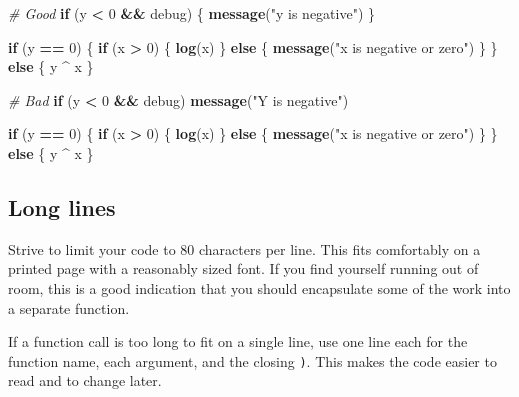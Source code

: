 \documentclass[]{book}
\newenvironment{Shaded}{\begin{snugshade}}{\end{snugshade}}
\newcommand{\KeywordTok}[1]{\textcolor[rgb]{0.13,0.29,0.53}{\textbf{#1}}}
\newcommand{\DecValTok}[1]{\textcolor[rgb]{0.00,0.00,0.81}{#1}}
\newcommand{\StringTok}[1]{\textcolor[rgb]{0.31,0.60,0.02}{#1}}
\newcommand{\CommentTok}[1]{\textcolor[rgb]{0.56,0.35,0.01}{\textit{#1}}}
\newcommand{\ControlFlowTok}[1]{\textcolor[rgb]{0.13,0.29,0.53}{\textbf{#1}}}
\newcommand{\OperatorTok}[1]{\textcolor[rgb]{0.81,0.36,0.00}{\textbf{#1}}}
\newcommand{\NormalTok}[1]{#1}
\theoremstyle{definition}
\theoremstyle{definition}
\theoremstyle{definition}
\theoremstyle{remark}
\begin{document}
\begin{Shaded}
\begin{Highlighting}[]
\CommentTok{# Good}
\ControlFlowTok{if}\NormalTok{ (y }\OperatorTok{<}\StringTok{ }\DecValTok{0} \OperatorTok{&&}\StringTok{ }\NormalTok{debug) \{}
  \KeywordTok{message}\NormalTok{(}\StringTok{"y is negative"}\NormalTok{)}
\NormalTok{\}}

\ControlFlowTok{if}\NormalTok{ (y }\OperatorTok{==}\StringTok{ }\DecValTok{0}\NormalTok{) \{}
  \ControlFlowTok{if}\NormalTok{ (x }\OperatorTok{>}\StringTok{ }\DecValTok{0}\NormalTok{) \{}
    \KeywordTok{log}\NormalTok{(x)}
\NormalTok{  \} }\ControlFlowTok{else}\NormalTok{ \{}
    \KeywordTok{message}\NormalTok{(}\StringTok{"x is negative or zero"}\NormalTok{)}
\NormalTok{  \}}
\NormalTok{\} }\ControlFlowTok{else}\NormalTok{ \{}
\NormalTok{  y }\OperatorTok{^}\StringTok{ }\NormalTok{x}
\NormalTok{\}}

\CommentTok{# Bad}
\ControlFlowTok{if}\NormalTok{ (y }\OperatorTok{<}\StringTok{ }\DecValTok{0} \OperatorTok{&&}\StringTok{ }\NormalTok{debug)}
\KeywordTok{message}\NormalTok{(}\StringTok{"Y is negative"}\NormalTok{)}

\ControlFlowTok{if}\NormalTok{ (y }\OperatorTok{==}\StringTok{ }\DecValTok{0}\NormalTok{)}
\NormalTok{\{}
    \ControlFlowTok{if}\NormalTok{ (x }\OperatorTok{>}\StringTok{ }\DecValTok{0}\NormalTok{) \{}
      \KeywordTok{log}\NormalTok{(x)}
\NormalTok{    \} }\ControlFlowTok{else}\NormalTok{ \{}
  \KeywordTok{message}\NormalTok{(}\StringTok{"x is negative or zero"}\NormalTok{)}
\NormalTok{    \}}
\NormalTok{\} }\ControlFlowTok{else}\NormalTok{ \{ y }\OperatorTok{^}\StringTok{ }\NormalTok{x \}}
\end{Highlighting}
\end{Shaded}

\subsection{Long lines}\label{long-lines}

Strive to limit your code to 80 characters per line. This fits
comfortably on a printed page with a reasonably sized font. If you find
yourself running out of room, this is a good indication that you should
encapsulate some of the work into a separate function.

If a function call is too long to fit on a single line, use one line
each for the function name, each argument, and the closing \texttt{)}.
This makes the code easier to read and to change later.
\end{document}
